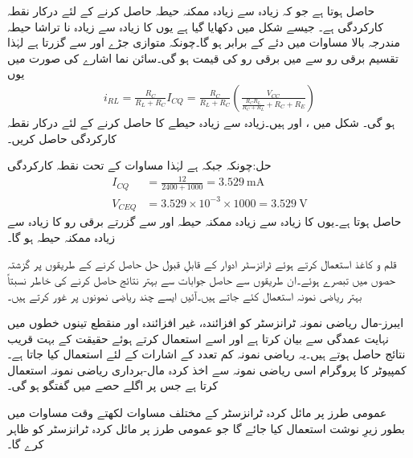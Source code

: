 حاصل ہوتا ہے جو کہ زیادہ سے زیادہ ممکنہ حیطہ حاصل کرنے کے لئے درکار نقطہ کارکردگی ہے۔ جیسے شکل  میں دکھایا گیا ہے یوں  کا زیادہ سے زیادہ نا تراشا حیطہ مندرجہ بالا مساوات میں دئے  کے برابر ہو گا۔چونکہ  متوازی جڑے  اور  سے گزرتا ہے لہٰذا تقسیم برقی رو سے  میں برقی رو  کی قیمت   ہو گی۔سائن نما اشارے کی صورت میں یوں
\begin{align}
i_{RL}=\frac{R_C}{R_L+R_C} I_{CQ} =\frac{R_C}{R_L+R_C}\left(\frac{V_{CC}}{\frac{R_C  R_L}{R_C + R_L}+R_C+R_E}\right)
\end{align}
ہو گی۔
شکل  میں ،  اور  ہیں۔زیادہ سے زیادہ حیطے کا   حاصل کرنے کے لئے درکار نقطہ کارکردگی حاصل کریں۔

حل:چونکہ  جبکہ  ہے لہٰذا مساوات  کے تحت نقطہ کارکردگی
\begin{align*}
I_{CQ}&=\frac{12}{2400+1000}=\SI{3.529}{\milli \ampere}\\
V_{CEQ}&=3.529 \times 10^{-3} \times 1000=\SI{3.529}{\volt}
\end{align*} 
حاصل ہوتا ہے۔یوں   کا زیادہ سے زیادہ ممکنہ حیطہ   اور  سے گزرتے برقی رو  کا زیادہ سے زیادہ ممکنہ حیطہ  ہو گا۔

قلم و کاغذ استعمال کرتے ہوئے ٹرانزسٹر ادوار کے قابلِ قبول حل حاصل کرنے کے طریقوں پر گزشتہ حصوں میں تبصرے ہوئے۔ان طریقوں سے حاصل جوابات سے بہتر نتائج حاصل کرنے کی خاطر نسبتاً بہتر ریاضی نمونہ  استعمال کئے جاتے ہیں۔آئیں ایسے چند ریاضی نمونوں پر غور کرتے ہیں۔

ایبرز-مال ریاضی نمونہ   ٹرانزسٹر کو افزائندہ، غیر افزائندہ اور منقطع تینوں خطوں میں نہایت عمدگی سے بیان کرتا ہے اور اسے استعمال کرتے ہوئے حقیقت کے بہت قریب نتائج حاصل ہوتے ہیں۔یہ ریاضی نمونہ  کم تعدد کے اشارات کے لئے استعمال کیا جاتا ہے۔کمپیوٹر کا پروگرام   اسی ریاضی نمونہ  سے اخذ کردہ مال-برداری ریاضی نمونہ   استعمال کرتا ہے جس پر اگلے حصے میں گفتگو ہو گی۔

عمومی طرز پر مائل کردہ  ٹرانزسٹر کے مختلف مساوات لکھتے وقت مساوات میں  بطور زیرِ نوشت استعمال کیا جائے گا جو عمومی طرز پر مائل کردہ ٹرانزسٹر کو ظاہر کرے گا۔


